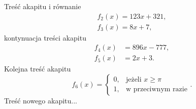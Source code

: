 Treść akapitu i równanie                 %
\begin{gather}                           %
f_{2}(x) = 123 x + 321 \label{eq:2}, \\  %
f_{3}(x) = 8 x + 7     \label{eq:3},     %
\end{gather}                             %
kontynuacja treści akapitu               %
\begin{align}                            %
f_{4}(x) &= 896 x - 777 \label{eq:4}, \\ %
f_{5}(x) &= 2 x + 3     \label{eq:5}.    %
\end{align}                              %
Kolejna treść akapitu                    %
\begin{equation}                         %
f_{6}(x) =                               %
\begin{cases}                            %
0, & \text{jeżeli $x \ge \pi$}  \\       %
1, & \text{w przeciwnym razie}           %
\end{cases}                              %
\label{eq:6}.                            %
\end{equation}                           %
Treść nowego akapitu...                  %
